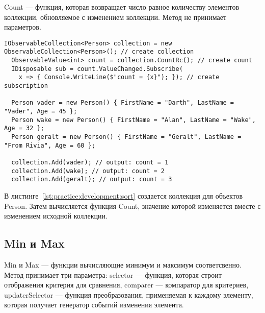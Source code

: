 Count --- функция, которая возвращает число равное количеству элементов коллекции, обновляемое с изменением коллекции.
Метод не принимает параметров.

\begin{lstlisting}[style=csharpinlinestyle, caption={Пример использования Count}, label=lst:practice:development:count]
  IObservableCollection<Person> collection = new ObservableCollection<Person>(); // create collection
  ObservableValue<int> count = collection.CountRc(); // create count
  IDisposable sub = count.ValueChanged.Subscribe(
    x => { Console.WriteLine($"count = {x}"); }); // create subscription

  Person vader = new Person() { FirstName = "Darth", LastName = "Vader", Age = 45 };
  Person wake = new Person() { FirstName = "Alan", LastName = "Wake", Age = 32 };
  Person geralt = new Person() { FirstName = "Geralt", LastName = "From Rivia", Age = 60 };

  collection.Add(vader); // output: count = 1
  collection.Add(wake); // output: count = 2
  collection.Add(geralt); // output: count = 3
\end{lstlisting}

В листинге~\ref{lst:practice:development:sort} создается коллекция для объектов Person. Затем вычисляется функция Count, значение которой изменяется вместе с изменением исходной коллекции.

\subsection{Min и Max}
\label{sub:development:min_max}

Min и Max --- функции вычисляющие минимум и максимум соответсвенно.
Метод принимает три параметра: selector --- функция, которая строит отображения критерия для сравнения, comparer --- компаратор для критериев,
updaterSelector --- функция преобразования, применяемая к каждому элементу, которая получает генератор событий изменения элемента.

